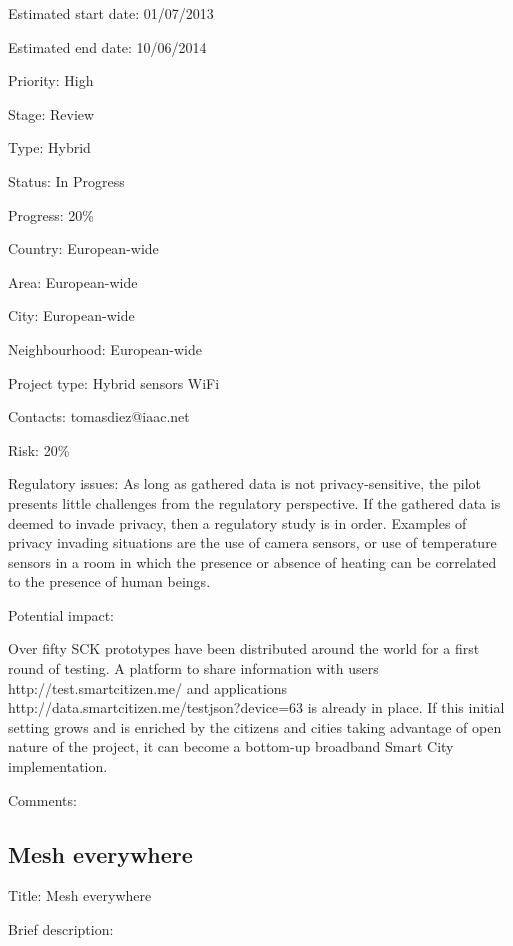 \documentclass[draftclsnofoot,12pt,journal,onecolumn]{IEEEtran}
\begin{document}
Estimated start date: 01/07/2013

Estimated end date: 10/06/2014

Priority: High

Stage: Review

Type: Hybrid

Status: In Progress

Progress: 20\%

Country: European-wide

Area: European-wide

City: European-wide

Neighbourhood: European-wide

Project type: Hybrid sensors WiFi

Contacts: tomasdiez@iaac.net

Risk: 20\%

Regulatory issues: As long as gathered data is not privacy-sensitive, the
pilot presents little challenges from the regulatory perspective. If the
gathered data is deemed to invade privacy, then a regulatory study is in
order. Examples of privacy invading situations are the use of camera sensors,
or use of temperature sensors in a room in which the presence or absence of
heating can be correlated to the presence of human beings.

Potential impact:

Over fifty SCK prototypes have been distributed around the world for a first
round of testing. A platform to share information with users
http://test.smartcitizen.me/
and applications
http://data.smartcitizen.me/testjson?device=63
is already in place. If this initial setting grows and is enriched by the
citizens and cities taking advantage of open nature of the project, it can
become a bottom-up broadband Smart City implementation.

Comments:

\subsection{Mesh everywhere}

Title: Mesh everywhere

Brief description:
\end{document}
